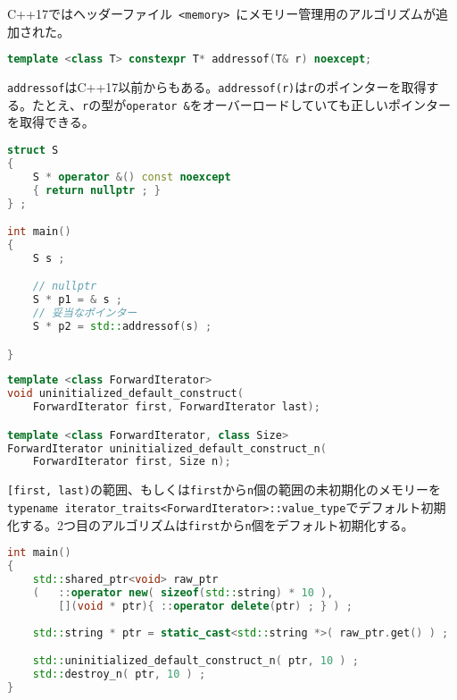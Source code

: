 %

C++17ではヘッダーファイル~\lstinline!<memory>!~にメモリー管理用のアルゴリズムが追加された。

%

\bgroup
\begin{lstlisting}[language=C++]
template <class T> constexpr T* addressof(T& r) noexcept;
\end{lstlisting}
\egroup

\lstinline!addressof!はC++17以前からもある。\lstinline!addressof(r)!は\lstinline!r!のポインターを取得する。たとえ、\lstinline!r!の型が\lstinline!operator &!をオーバーロードしていても正しいポインターを取得できる。

\begin{lstlisting}[language=C++]
struct S
{
    S * operator &() const noexcept
    { return nullptr ; } 
} ;

int main()
{
    S s ;

    // nullptr
    S * p1 = & s ;
    // 妥当なポインター
    S * p2 = std::addressof(s) ;

}
\end{lstlisting}

%

\bgroup
\begin{lstlisting}[language=C++]
template <class ForwardIterator>
void uninitialized_default_construct(
    ForwardIterator first, ForwardIterator last);

template <class ForwardIterator, class Size>
ForwardIterator uninitialized_default_construct_n(
    ForwardIterator first, Size n);
\end{lstlisting}
\egroup

\lstinline![first, last)!の範囲、もしくは\lstinline!first!から\lstinline!n!個の範囲の未初期化のメモリーを\lstinline!typename iterator_traits<ForwardIterator>::value_type!でデフォルト初期化する。2つ目のアルゴリズムは\lstinline!first!から\lstinline!n!個をデフォルト初期化する。

\begin{lstlisting}[language=C++]
int main()
{
    std::shared_ptr<void> raw_ptr
    (   ::operator new( sizeof(std::string) * 10 ),
        [](void * ptr){ ::operator delete(ptr) ; } ) ;
 
    std::string * ptr = static_cast<std::string *>( raw_ptr.get() ) ;

    std::uninitialized_default_construct_n( ptr, 10 ) ;
    std::destroy_n( ptr, 10 ) ;
}
\end{lstlisting}

